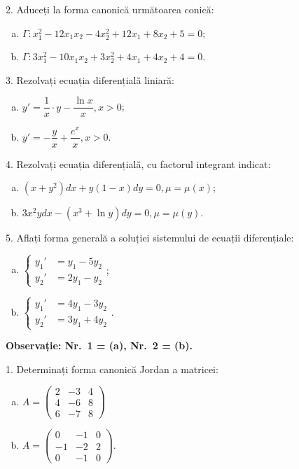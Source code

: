 \vspace{1cm}

2. Aduceți la forma canonică următoarea conică:
\begin{enumerate}[(a)]
  \item $ \Gamma: x_1^2 - 12x_1x_2 - 4x_2^2 + 12x_1 + 8x_2 + 5 = 0 $;
  \item $ \Gamma: 3x_1^2 - 10x_1x_2 + 3x_2^2 + 4x_1 + 4x_2 + 4 = 0 $.
\end{enumerate}

\vspace{1cm}

3. Rezolvați ecuația diferențială liniară:
\begin{enumerate}[(a)]
  \item $ y' = \dfrac{1}{x} \cdot y - \dfrac{\ln x}{x}, x > 0 $;
  \item $ y' = -\dfrac{y}{x} + \dfrac{e^x}{x}, x > 0 $.
\end{enumerate}

\vspace{1cm}

4. Rezolvați ecuația diferențială, cu factorul integrant indicat:
\begin{enumerate}[(a)]
  \item $ (x + y^2)dx + y(1 - x)dy = 0, \mu = \mu(x) $;
  \item $ 3x^2 y dx - (x^3 + \ln y) dy = 0, \mu = \mu(y) $.
\end{enumerate}

\vspace{1cm}

5. Aflați forma generală a soluției sistemului de ecuații diferențiale:
\begin{enumerate}[(a)]
  \item $ \begin{cases}
      y_1' &= y_1 - 5y_2 \\
      y_2' &= 2y_1 - y_2
    \end{cases}
    $;
  \item $ \begin{cases}
      y_1' &= 4y_1 - 3y_2 \\
      y_2' &= 3y_1 + 4y_2
    \end{cases}
    $.
\end{enumerate}



\textbf{Observație: Nr.\ 1 = (a), Nr.\ 2 = (b).}

1. Determinați forma canonică Jordan a matricei:
\begin{enumerate}[(a)]
  \item $ A = %
    \begin{pmatrix}
      2 & -3 & 4 \\
      4 & -6 & 8 \\
      6 & -7 & 8
    \end{pmatrix} $
  \item $ A = %
    \begin{pmatrix}
      0 & -1 & 0 \\
      -1 & -2 & 2 \\
      0 & -1 & 0
    \end{pmatrix} $.
\end{enumerate}


